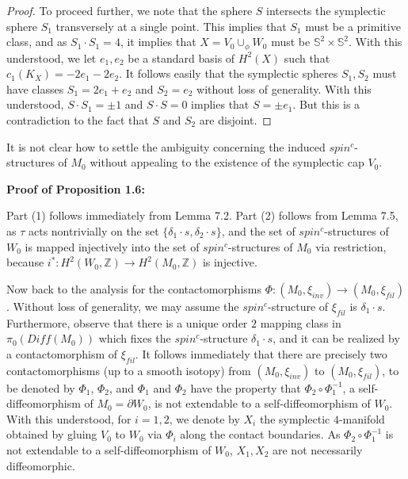 \documentclass[11pt]{amsart}
\theoremstyle{plain}
\numberwithin{theorem}{section}
\theoremstyle{definition}
\newcommand{\Z}{{\mathbb Z}}
\newcommand{\s}{{\mathbb S}}
\begin{document}
\begin{proof}
To proceed further, we note that the sphere $S$ intersects the symplectic sphere $S_1$ transversely
at a single point. This implies that $S_1$ must be a primitive class, and as $S_1\cdot S_1=4$, it implies 
that $X=V_0\cup_\phi W_0$ must be $\s^2\times \s^2$. With this understood, we let $e_1,e_2$
be a standard basis of $H^2(X)$ such that $c_1(K_X)=-2e_1-2e_2$. It follows easily that
the symplectic spheres $S_1,S_2$ must have classes $S_1=2e_1+e_2$ and $S_2=e_2$
without loss of generality. With this understood, $S\cdot S_1=\pm 1$
and $S\cdot S=0$ implies that $S=\pm e_1$. But this is a contradiction to the fact that $S$ and $S_2$
are disjoint. 

\end{proof}

It is not clear how to settle the ambiguity concerning the induced $spin^c$-structures of $M_0$ 
without appealing to the existence of the symplectic cap $V_0$. 

\vspace{2mm}

{\bf Proof of Proposition 1.6:}

\vspace{2mm}

Part (1) follows immediately from Lemma 7.2. Part (2) follows from Lemma 7.5, as $\tau$ acts nontrivially on the set 
$\{\delta_1\cdot s,\delta_2\cdot s\}$, and the set of $spin^c$-structures of $W_0$ is mapped injectively into the
set of $spin^c$-structures of $M_0$ via restriction, because $i^\ast: H^2(W_0,\Z)\rightarrow H^2(M_0,\Z)$ is injective. 

\vspace{2mm}

Now back to the analysis for the contactomorphisms $\Phi: (M_0,\xi_{inv})\rightarrow (M_0,\xi_{fil})$.
Without loss of generality, we may assume the $spin^c$-structure of $\xi_{fil}$ is 
$\delta_1\cdot s$. Furthermore, observe that there is a unique order $2$ mapping class in 
$\pi_0(Diff(M_0))$ which fixes the $spin^c$-structure $\delta_1\cdot s$, and it can be realized 
by a contactomorphism of $\xi_{fil}$. It follows immediately that there are precisely two contactomorphisms (up to a smooth isotopy) from $(M_0,\xi_{inv})$ to $(M_0,\xi_{fil})$, 
to be denoted by $\Phi_1$, $\Phi_2$, and $\Phi_1$ and $\Phi_2$ have the property that $\Phi_2\circ \Phi_1^{-1}$, a self-diffeomorphism of $M_0=\partial W_0$, is not extendable to a self-diffeomorphism of $W_0$. With this understood, for $i=1,2$, we denote by $X_i$ the symplectic $4$-manifold obtained by gluing 
$V_0$ to $W_0$ via $\Phi_i$ along the contact boundaries. As $\Phi_2\circ \Phi_1^{-1}$ is not
extendable to a self-diffeomorphism of $W_0$, $X_1,X_2$ are not necessarily diffeomorphic. 
\end{document}
